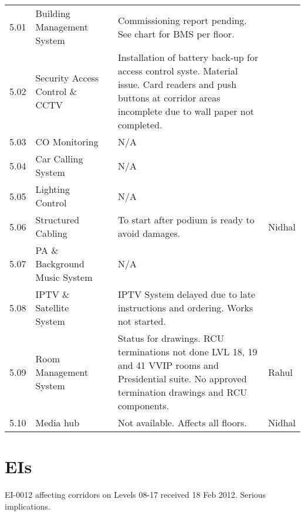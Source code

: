 \begin{fullwidth}
\begin{longtable}{@{}lp{3.5cm}@{}lp{5cm}p{1.5cm}}
5.01	&Building Management System	&& Commissioning report pending. See chart for BMS per floor.& \\	


5.02	&Security Access Control \& CCTV	&&Installation of battery back-up for access control syste. Material issue. Card readers and push buttons at corridor areas incomplete due to wall paper not completed.&\\	

5.03	&CO Monitoring		&&N/A&\\

5.04	&Car Calling System		&&N/A&\\

5.05	&Lighting Control		&&N/A&\\

5.06	&Structured Cabling		&&To start after podium is ready to avoid damages.& Nidhal\\

5.07	&PA \& Background Music System &&N/A&\\
	
5.08	&IPTV \& Satellite System	&&IPTV System delayed due to late instructions and ordering. Works not started.&\\	

5.09	&Room Management System	&&Status for drawings. RCU terminations not done LVL 18, 19 and 41 VVIP rooms and Presidential suite. No approved termination drawings and RCU components.&Rahul\\

5.10 &Media hub && Not available. Affects all floors.&Nidhal \\

\bottomrule
\end{longtable}
\end{fullwidth}

\section{EIs}

EI-0012 affecting corridors on Levels 08-17 received 18 Feb 2012. Serious implications.


















